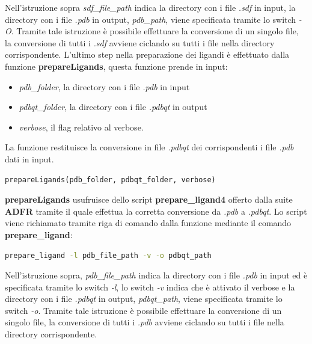 Nell'istruzione sopra \textit{sdf\_file\_path} indica la directory con i file \textit{.sdf} in input, la directory con i file \textit{.pdb} in output, \textit{pdb\_path}, viene specificata tramite lo switch \textit{-O}. Tramite tale istruzione è possibile effettuare la conversione di un singolo file, la conversione di tutti i \textit{.sdf} avviene ciclando su tutti i file nella directory corrispondente.\newline
L'ultimo step nella preparazione dei ligandi è effettuato dalla funzione \textbf{prepareLigands}, questa funzione prende in input:

\begin{itemize}
    \item \textit{pdb\_folder}, la directory con i file \textit{.pdb} in input
    \item \textit{pdbqt\_folder}, la directory con i file \textit{.pdbqt} in output
    \item \textit{verbose}, il flag relativo al verbose.
\end{itemize}

La funzione restituisce la conversione in file \textit{.pdbqt} dei corrispondenti i file \textit{.pdb} dati in input.

\begin{lstlisting}[language=Python, label=lst:code9,  caption={funzione prepareLigands}]
prepareLigands(pdb_folder, pdbqt_folder, verbose)
\end{lstlisting}

\textbf{prepareLigands} usufruisce dello script \textbf{prepare\_ligand4} offerto dalla suite \textbf{ADFR} tramite il quale effettua la corretta conversione da \textit{.pdb} a \textit{.pdbqt}. Lo script viene richiamato tramite riga di comando dalla funzione mediante il comando \textbf{prepare\_ligand}:

\begin{lstlisting}[language=Bash, label=lst:code10, caption={Comando per la conversione da \textit{.pdb} a \textit{.pdbqt}}]
prepare_ligand -l pdb_file_path -v -o pdbqt_path
\end{lstlisting}

Nell'istruzione sopra, \textit{pdb\_file\_path} indica la directory con i file \textit{.pdb} in input ed è specificata tramite lo switch \textit{-l}, lo switch \textit{-v} indica che è attivato il verbose e la directory con i file \textit{.pdbqt} in output, \textit{pdbqt\_path}, viene specificata tramite lo switch \textit{-o}. Tramite tale istruzione è possibile effettuare la conversione di un singolo file, la conversione di tutti i \textit{.pdb} avviene ciclando su tutti i file nella directory corrispondente.

